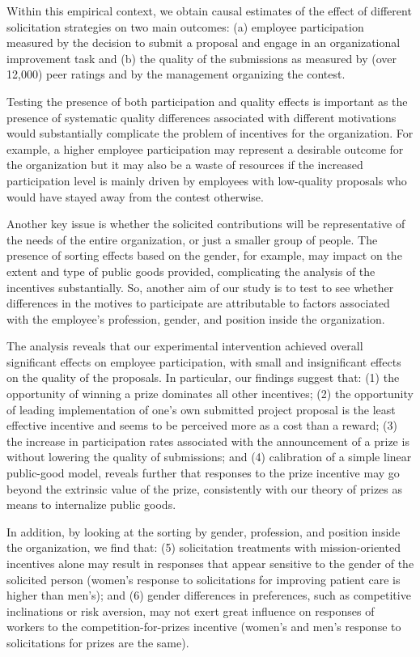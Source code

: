 \documentclass[11pt, titlepage]{article}
\begin{document}
Within this empirical context, we obtain causal estimates of the effect
of different solicitation strategies on two main outcomes: (a) employee
participation measured by the decision to submit a proposal and engage
in an organizational improvement task and (b) the quality of the
submissions as measured by (over 12,000) peer ratings and by the
management organizing the contest.

Testing the presence of both participation and quality effects is
important as the presence of systematic quality differences associated
with different motivations would substantially complicate the problem of
incentives for the organization. For example, a higher employee
participation may represent a desirable outcome for the organization but
it may also be a waste of resources if the increased participation level
is mainly driven by employees with low-quality proposals who would have
stayed away from the contest otherwise.

Another key issue is whether the solicited contributions will be
representative of the needs of the entire organization, or just a
smaller group of people. The presence of sorting effects based on the
gender, for example, may impact on the extent and type of public goods
provided, complicating the analysis of the incentives substantially. So,
another aim of our study is to test to see whether differences in the
motives to participate are attributable to factors associated with the
employee's profession, gender, and position inside the organization.

The analysis reveals that our experimental intervention achieved overall
significant effects on employee participation, with small and
insignificant effects on the quality of the proposals. In particular,
our findings suggest that: (1) the opportunity of winning a prize
dominates all other incentives; (2) the opportunity of leading
implementation of one's own submitted project proposal is the least
effective incentive and seems to be perceived more as a cost than a
reward; (3) the increase in participation rates associated with the
announcement of a prize is without lowering the quality of submissions;
and (4) calibration of a simple linear public-good model, reveals
further that responses to the prize incentive may go beyond the
extrinsic value of the prize, consistently with our theory of prizes as
means to internalize public goods.

In addition, by looking at the sorting by gender, profession, and
position inside the organization, we find that: (5) solicitation
treatments with mission-oriented incentives alone may result in
responses that appear sensitive to the gender of the solicited person
(women's response to solicitations for improving patient care is higher
than men's); and (6) gender differences in preferences, such as
competitive inclinations or risk aversion, may not exert great influence
on responses of workers to the competition-for-prizes incentive (women's
and men's response to solicitations for prizes are the same).
\end{document}
